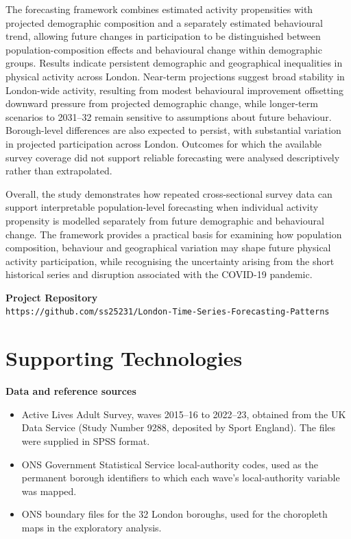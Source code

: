 \documentclass[ %
                    author={Ashrey Ashrey, Sanya Kapoor, Trisha Sharma, Yash Bhooshan Pandloskar},
                supervisor={Dr. Dalila O’Grady},
                    degree={MSc},
                     title={Using machine learning to forecast physical activity participation, volunteering and activity patterns in London},
                  subtitle={},
                      type={},
                      year={2021}]{dissertation}
\begin{document}
The forecasting framework combines estimated activity propensities with projected demographic composition and a separately estimated behavioural trend, allowing future changes in participation to be distinguished between population-composition effects and behavioural change within demographic groups. Results indicate persistent demographic and geographical inequalities in physical activity across London. Near-term projections suggest broad stability in London-wide activity, resulting from modest behavioural improvement offsetting downward pressure from projected demographic change, while longer-term scenarios to 2031--32 remain sensitive to assumptions about future behaviour. Borough-level differences are also expected to persist, with substantial variation in projected participation across London. Outcomes for which the available survey coverage did not support reliable forecasting were analysed descriptively rather than extrapolated.

Overall, the study demonstrates how repeated cross-sectional survey data can support interpretable population-level forecasting when individual activity propensity is modelled separately from future demographic and behavioural change. The framework provides a practical basis for examining how population composition, behaviour and geographical variation may shape future physical activity participation, while recognising the uncertainty arising from the short historical series and disruption associated with the COVID-19 pandemic.

\vspace{1.2cm}

\noindent
\textbf{Project Repository}\\[2pt]
\texttt{https://github.com/ss25231/London-Time-Series-Forecasting-Patterns}





\chapter*{Supporting Technologies}

\noindent
\textbf{Data and reference sources}
\begin{itemize}
  \item Active Lives Adult Survey, waves 2015--16 to 2022--23, obtained from the
        UK Data Service (Study Number 9288, deposited by Sport England). The
        files were supplied in SPSS format.
  \item ONS Government Statistical Service local-authority codes, used as the
        permanent borough identifiers to which each wave's local-authority
        variable was mapped.
  \item ONS boundary files for the 32 London boroughs, used for the choropleth
        maps in the exploratory analysis.
\end{itemize}
\end{document}
